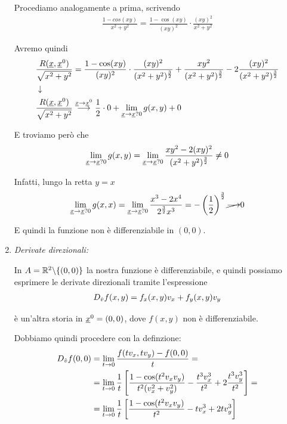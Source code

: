 \begin{enumerate}
	Procediamo analogamente a prima, scrivendo
	\begin{align}
		\frac{1 - cos(xy)}{x^2 + y^2}=\frac{1 - \cos(xy)}{(xy)^2} \cdot \frac{(xy)^2}{x^2 + y^2}
	\end{align}
	
	\newpage
	
	Avremo quindi
	\begin{align}
		{}&\frac{R(\underline{x}, \underline{x}^0)}{\sqrt{x^2 + y^2}}=\frac{1 - \cos(xy)}{(xy)^2} \cdot \frac{(xy)^2}{(x^2 + y^2)^{\frac{3}{2}}} + \frac{xy^2}{(x^2 + y^2)^{\frac{3}{2}}} - 2\frac{(xy)^2}{(x^2 + y^2)^{\frac{3}{2}}} \nonumber \\ &\downarrow \nonumber \\
		&\frac{R(\underline{x}, \underline{x}^0)}{\sqrt{x^2 + y^2}}\overset{\underline{x} \rightarrow \underline{x}^0}{\longrightarrow} \frac{1}{2} \cdot 0 + \underset{\underline{x} \rightarrow \underline{x}?0}{\lim} \, g(x,y) + 0
	\end{align}
	
	E troviamo però che
	\begin{align}
		\underset{\underline{x} \rightarrow \underline{x}?0}{\lim} \, g(x,y) = \underset{\underline{x} \rightarrow \underline{x}?0}{\lim} \, \frac{xy^2 - 2(xy)^2}{(x^2 + y^2)^{\frac{3}{2}}} \neq 0
	\end{align}
	
	Infatti, lungo la retta $y=x$
	\begin{align}
		\underset{\underline{x} \rightarrow \underline{x}?0}{\lim} \,g(x,x)= \underset{\underline{x} \rightarrow \underline{x}?0}{\lim} \,\frac{x^3 - 2x^4}{2^{\frac{3}{2}}x^3}= -\left(\frac{1}{2}\right)^{\frac{3}{2}} \cancel{\longrightarrow} 0 
	\end{align}
	
	E quindi la funzione non è differenziabile in $(0,0)$.
	
	\item \textit{Derivate direzionali:}
	
	In $A=\mathbb{R}^2\backslash \{ (0,0) \}$ la nostra funzione è differenziabile, e quindi possiamo esprimere le derivate direzionali tramite l'espressione
	\begin{align}
		D_{\hat v} f(x,y)= f_x(x,y) v_x + f_y(x,y) v_y
	\end{align}
	
	è un'altra storia in $\underline{x}^0=(0,0)$, dove $f(x,y)$ non è differenziabile. 
	
	Dobbiamo quindi procedere con la definzione:
	\begin{align}
		D_{\hat v} f(0,0) {}&= \underset{t \rightarrow 0}{\lim} \, \frac{f(tv_x, tv_y) - f(0,0)}{t} = \nonumber \\
		&= \underset{t \rightarrow 0}{\lim} \,\frac{1}{t} \left[ \frac{1- \cos(t^2 v_x v_y)}{t^2(v_x^2 + v_y^2)} - \frac{t^3 v_x^3}{t^2} + 2 \frac{t^3 v_y^3}{t^2} \right] = \nonumber \\
		&= \underset{t \rightarrow 0}{\lim} \,\frac{1}{t} \left[ \frac{1- \cos(t^2 v_x v_y)}{t^2} -  tv_x^3 + 2 tv_y^3 \right]
	\end{align}
	

\end{enumerate}
